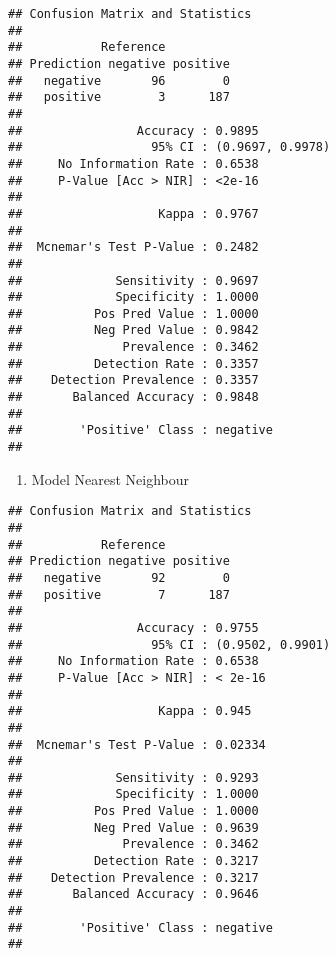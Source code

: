 \documentclass[]{article}
\newenvironment{Shaded}{\begin{snugshade}}{\end{snugshade}}
\newcommand{\DataTypeTok}[1]{\textcolor[rgb]{0.13,0.29,0.53}{#1}}
\newcommand{\KeywordTok}[1]{\textcolor[rgb]{0.13,0.29,0.53}{\textbf{#1}}}
\newcommand{\NormalTok}[1]{#1}
\newcommand{\OperatorTok}[1]{\textcolor[rgb]{0.81,0.36,0.00}{\textbf{#1}}}
\newcommand{\StringTok}[1]{\textcolor[rgb]{0.31,0.60,0.02}{#1}}
\providecommand{\tightlist}{%
  \setlength{\itemsep}{0pt}\setlength{\parskip}{0pt}}
\begin{document}
\begin{verbatim}
## Confusion Matrix and Statistics
## 
##           Reference
## Prediction negative positive
##   negative       96        0
##   positive        3      187
##                                           
##                Accuracy : 0.9895          
##                  95% CI : (0.9697, 0.9978)
##     No Information Rate : 0.6538          
##     P-Value [Acc > NIR] : <2e-16          
##                                           
##                   Kappa : 0.9767          
##                                           
##  Mcnemar's Test P-Value : 0.2482          
##                                           
##             Sensitivity : 0.9697          
##             Specificity : 1.0000          
##          Pos Pred Value : 1.0000          
##          Neg Pred Value : 0.9842          
##              Prevalence : 0.3462          
##          Detection Rate : 0.3357          
##    Detection Prevalence : 0.3357          
##       Balanced Accuracy : 0.9848          
##                                           
##        'Positive' Class : negative        
## 
\end{verbatim}

\begin{enumerate}
\def\labelenumi{\arabic{enumi}.}
\setcounter{enumi}{3}
\tightlist
\item
  Model Nearest Neighbour
\end{enumerate}

\begin{Shaded}
\end{Shaded}

\begin{verbatim}
## Confusion Matrix and Statistics
## 
##           Reference
## Prediction negative positive
##   negative       92        0
##   positive        7      187
##                                           
##                Accuracy : 0.9755          
##                  95% CI : (0.9502, 0.9901)
##     No Information Rate : 0.6538          
##     P-Value [Acc > NIR] : < 2e-16         
##                                           
##                   Kappa : 0.945           
##                                           
##  Mcnemar's Test P-Value : 0.02334         
##                                           
##             Sensitivity : 0.9293          
##             Specificity : 1.0000          
##          Pos Pred Value : 1.0000          
##          Neg Pred Value : 0.9639          
##              Prevalence : 0.3462          
##          Detection Rate : 0.3217          
##    Detection Prevalence : 0.3217          
##       Balanced Accuracy : 0.9646          
##                                           
##        'Positive' Class : negative        
## 
\end{verbatim}
\end{document}
